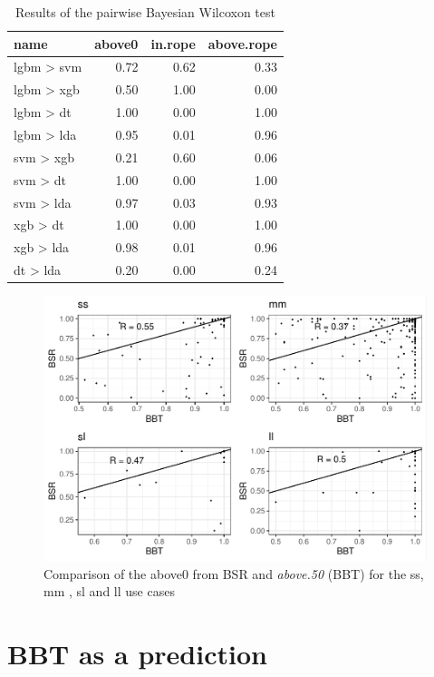 \documentclass[twoside,11pt,preprint]{article}
\begin{document}
\begin{table}

\caption{\label{tab:xpairbays1}\label{tab:pairbays1}Results of the pairwise Bayesian Wilcoxon test}
\centering
\begin{tabular}[t]{lrrr}
\toprule
\textbf{name} & \textbf{above0} & \textbf{in.rope} & \textbf{above.rope}\\
\midrule
lgbm > svm & 0.72 & 0.62 & 0.33\\
lgbm > xgb & 0.50 & 1.00 & 0.00\\
lgbm > dt & 1.00 & 0.00 & 1.00\\
lgbm > lda & 0.95 & 0.01 & 0.96\\
svm > xgb & 0.21 & 0.60 & 0.06\\
\addlinespace
svm > dt & 1.00 & 0.00 & 1.00\\
svm > lda & 0.97 & 0.03 & 0.93\\
xgb > dt & 1.00 & 0.00 & 1.00\\
xgb > lda & 0.98 & 0.01 & 0.96\\
dt > lda & 0.20 & 0.00 & 0.24\\
\bottomrule
\end{tabular}
\end{table}

\begin{figure}
\includegraphics[width=0.9\linewidth]{figure_latex/bsr1-1} \caption{\label{fig:bsr}Comparison of the above0 from BSR and {\em above.50} (BBT) for the ss, mm , sl and ll use cases}\label{fig:bsr1}
\end{figure}

\hypertarget{bbt-as-a-prediction}{%
\section{\texorpdfstring{BBT as a prediction \label{predictive}}{BBT as a prediction }}\label{bbt-as-a-prediction}}
\end{document}
